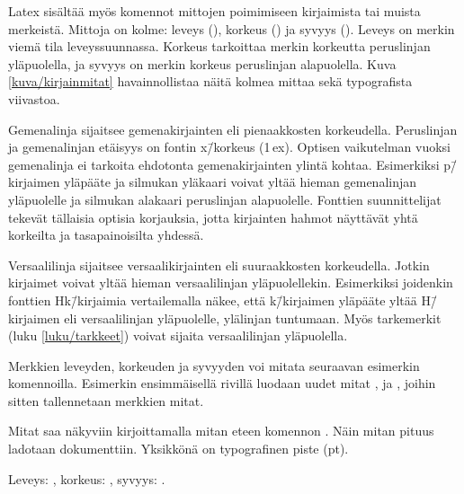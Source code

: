 Latex sisältää myös komennot mittojen poimimiseen kirjaimista tai muista
merkeistä. Mittoja on kolme: leveys (), korkeus
() ja syvyys (). Leveys on merkin
viemä tila leveyssuunnassa. Korkeus tarkoittaa merkin korkeutta
peruslinjan yläpuolella, ja syvyys on merkin korkeus peruslinjan
alapuolella. Kuva \ref{kuva/kirjainmitat} havainnollistaa näitä kolmea
mittaa sekä typografista viivastoa.

Gemenalinja sijaitsee gemenakirjainten eli pienaakkosten korkeudella.
Peruslinjan ja gemenalinjan etäisyys on fontin x\=/korkeus (1\,ex).
Optisen vaikutelman vuoksi gemenalinja ei tarkoita ehdotonta
gemenakirjainten ylintä kohtaa. Esimerkiksi p\=/kirjaimen yläpääte ja
silmukan yläkaari voivat yltää hieman gemenalinjan yläpuolelle ja
silmukan alakaari peruslinjan alapuolelle. Fonttien suunnittelijat
tekevät tällaisia optisia korjauksia, jotta kirjainten hahmot näyttävät
yhtä korkeilta ja tasapainoisilta yhdessä.

Versaalilinja sijaitsee versaalikirjainten eli suuraakkosten
korkeudella. Jotkin kirjaimet voivat yltää hieman versaalilinjan
yläpuolellekin. Esimerkiksi joidenkin fonttien Hk\=/kirjaimia
vertailemalla näkee, että k\=/kirjaimen yläpääte yltää H\=/kirjaimen eli
versaalilinjan yläpuolelle, ylälinjan tuntumaan. Myös tarkemerkit (luku
\ref{luku/tarkkeet}) voivat sijaita versaalilinjan yläpuolella.

Merkkien leveyden, korkeuden ja syvyyden voi mitata seuraavan esimerkin
komennoilla. Esimerkin ensimmäisellä rivillä luodaan uudet mitat
,  ja , joihin sitten
tallennetaan merkkien mitat.

\begin{koodilohkosis}
\newlength{\leveys} \newlength{\korkeus} \newlength{\syvyys}
\settowidth{\leveys}{abc} %
\end{koodilohkosis}

\noindent
Mitat saa näkyviin kirjoittamalla mitan eteen komennon .
Näin mitan pituus ladotaan dokumenttiin. Yksikkönä on typografinen piste
(pt).

\begin{koodilohkosis}
Leveys: \the\leveys, korkeus: \the\korkeus, syvyys: \the\syvyys.
\end{koodilohkosis}

